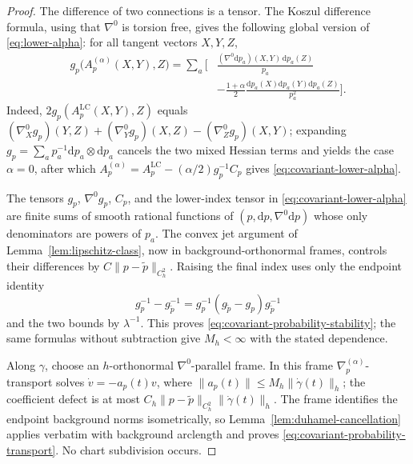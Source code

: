 \documentclass[11pt]{article}
\theoremstyle{definition}
\theoremstyle{remark}
\newcommand{\LC}{\mathrm{LC}}
\newcommand{\dd}{\mathrm{d}}
\begin{document}
\begin{proof}
The difference of two connections is a tensor. The Koszul difference formula,
using that $\nabla^0$ is torsion free, gives the following global version of
\eqref{eq:lower-alpha}: for all tangent vectors $X,Y,Z$,
\begin{equation}
\begin{split}
  g_p\bigl(A_p^{(\alpha)}(X,Y),Z\bigr)
  =\sum_a\Bigg[
     &\frac{(\nabla^0\dd p_a)(X,Y)\,\dd p_a(Z)}{p_a}\\
     &-\frac{1+\alpha}{2}
      \frac{\dd p_a(X)\dd p_a(Y)\dd p_a(Z)}{p_a^2}
  \Bigg].
  \label{eq:covariant-lower-alpha}
\end{split}
\end{equation}
Indeed,
$2g_p(A_p^{\LC}(X,Y),Z)$ equals
$(\nabla^0_Xg_p)(Y,Z)+(\nabla^0_Yg_p)(X,Z)
-(\nabla^0_Zg_p)(X,Y)$; expanding
$g_p=\sum_a p_a^{-1}\dd p_a\otimes\dd p_a$ cancels the two mixed Hessian
terms and yields the case $\alpha=0$, after which
$A_p^{(\alpha)}=A_p^{\LC}-(\alpha/2)g_p^{-1}C_p$ gives
\eqref{eq:covariant-lower-alpha}.

The tensors $g_p$, $\nabla^0g_p$, $C_p$, and the lower-index tensor in
\eqref{eq:covariant-lower-alpha} are finite sums of smooth rational functions
of $(p,\dd p,\nabla^0\dd p)$ whose only denominators are powers of $p_a$.
The convex jet argument of Lemma~\ref{lem:lipschitz-class}, now in
background-orthonormal frames, controls their differences by
$C\|p-\widetilde p\|_{C^2_h}$. Raising the final index uses only the endpoint
identity
\[
  g_p^{-1}-g_{\widetilde p}^{-1}
  =g_p^{-1}(g_{\widetilde p}-g_p)g_{\widetilde p}^{-1}
\]
and the two bounds by $\lambda^{-1}$. This proves
\eqref{eq:covariant-probability-stability}; the same formulas without
subtraction give $M_h<\infty$ with the stated dependence.

Along $\gamma$, choose an $h$-orthonormal $\nabla^0$-parallel frame. In this
frame $\nabla_p^{(\alpha)}$-transport solves
$\dot v=-a_p(t)v$, where
$\|a_p(t)\|\le M_h\|\dot\gamma(t)\|_h$; the coefficient defect is at most
$C_h\|p-\widetilde p\|_{C^2_h}\|\dot\gamma(t)\|_h$. The frame identifies the
endpoint background norms isometrically, so Lemma~\ref{lem:duhamel-cancellation}
applies verbatim with background arclength and proves
\eqref{eq:covariant-probability-transport}. No chart subdivision occurs.


\end{proof}
\end{document}
